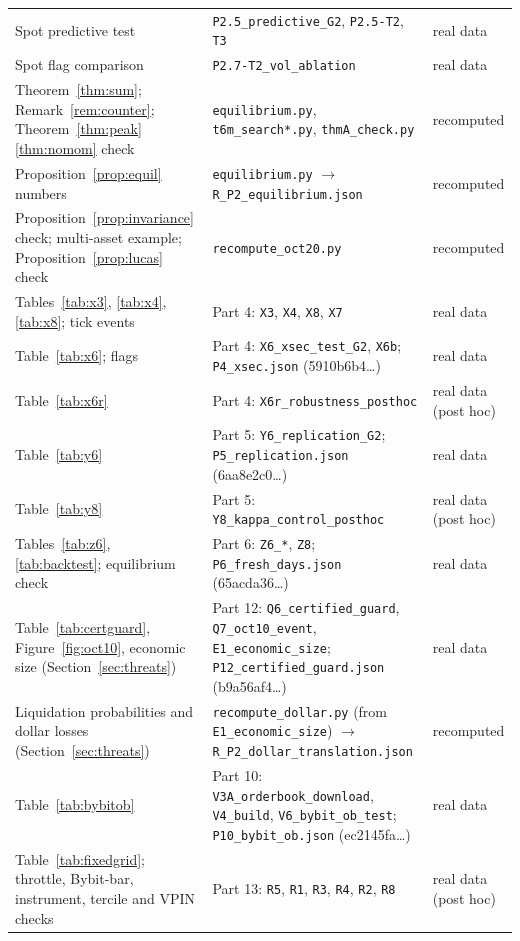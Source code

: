 \documentclass[12pt]{article}
\theoremstyle{definition}
\theoremstyle{remark}
\begin{document}
\begin{longtable}{p{}p{}p{}}
Spot predictive test & \texttt{P2.5\_predictive\_G2}, \texttt{P2.5-T2}, \texttt{T3} & real data\\
Spot flag comparison & \texttt{P2.7-T2\_vol\_ablation} & real data\\
Theorem~\ref{thm:sum}; Remark~\ref{rem:counter}; Theorem~\ref{thm:peak}\ref{thm:nomom} check & \texttt{equilibrium.py}, \texttt{t6m\_search*.py}, \texttt{thmA\_check.py} & recomputed\\
Proposition~\ref{prop:equil} numbers & \texttt{equilibrium.py} $\to$ \texttt{R\_P2\_equilibrium.json} & recomputed\\
Proposition~\ref{prop:invariance} check; multi-asset example; Proposition~\ref{prop:lucas} check & \texttt{recompute\_oct20.py} & recomputed\\
Tables~\ref{tab:x3}, \ref{tab:x4}, \ref{tab:x8}; tick events & Part 4: \texttt{X3}, \texttt{X4}, \texttt{X8}, \texttt{X7} & real data\\
Table~\ref{tab:x6}; flags & Part 4: \texttt{X6\_xsec\_test\_G2}, \texttt{X6b}; \texttt{P4\_xsec.json} (5910b6b4\ldots) & real data\\
Table~\ref{tab:x6r} & Part 4: \texttt{X6r\_robustness\_posthoc} & real data (post hoc)\\
Table~\ref{tab:y6} & Part 5: \texttt{Y6\_replication\_G2}; \texttt{P5\_replication.json} (6aa8e2c0\ldots) & real data\\
Table~\ref{tab:y8} & Part 5: \texttt{Y8\_kappa\_control\_posthoc} & real data (post hoc)\\
Tables~\ref{tab:z6}, \ref{tab:backtest}; equilibrium check & Part 6: \texttt{Z6\_*}, \texttt{Z8}; \texttt{P6\_fresh\_days.json} (65acda36\ldots) & real data\\
Table~\ref{tab:certguard}, Figure~\ref{fig:oct10}, economic size (Section~\ref{sec:threats}) & Part 12: \texttt{Q6\_certified\_guard}, \texttt{Q7\_oct10\_event}, \texttt{E1\_economic\_size}; \texttt{P12\_certified\_guard.json} (b9a56af4\ldots) & real data\\
Liquidation probabilities and dollar losses (Section~\ref{sec:threats}) & \texttt{recompute\_dollar.py} (from \texttt{E1\_economic\_size}) $\to$ \texttt{R\_P2\_dollar\_translation.json} & recomputed\\
Table~\ref{tab:bybitob} & Part 10: \texttt{V3A\_orderbook\_download}, \texttt{V4\_build}, \texttt{V6\_bybit\_ob\_test}; \texttt{P10\_bybit\_ob.json} (ec2145fa\ldots) & real data\\
Table~\ref{tab:fixedgrid}; throttle, Bybit-bar, instrument, tercile and VPIN checks & Part 13: \texttt{R5}, \texttt{R1}, \texttt{R3}, \texttt{R4}, \texttt{R2}, \texttt{R8} & real data (post hoc)\\

\end{longtable}
\end{document}
